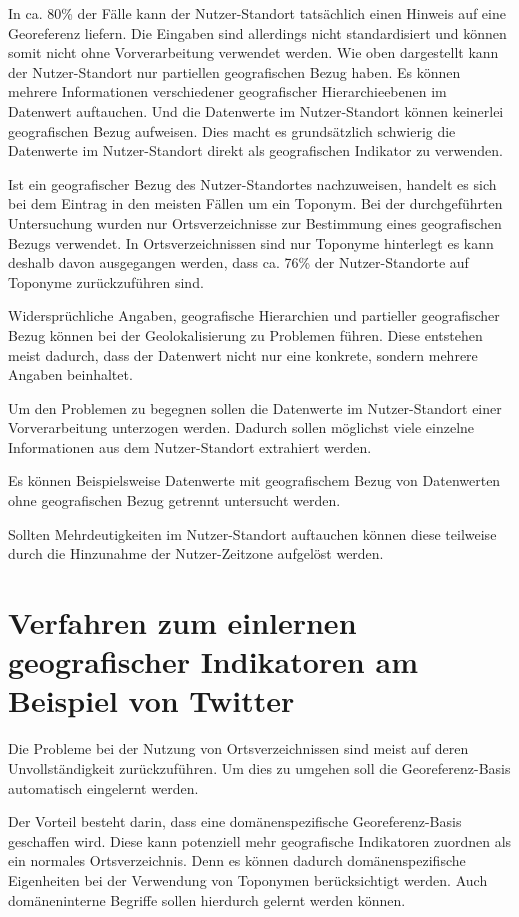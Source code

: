 			In ca. 80\% der Fälle kann der Nutzer-Standort tatsächlich einen Hinweis auf eine Georeferenz liefern.
			Die Eingaben sind allerdings nicht standardisiert und können somit nicht ohne Vorverarbeitung verwendet werden.
			Wie oben dargestellt kann der Nutzer-Standort nur partiellen geografischen Bezug haben.
			Es können mehrere Informationen verschiedener geografischer Hierarchieebenen im Datenwert auftauchen. 
			Und die Datenwerte im Nutzer-Standort können keinerlei geografischen Bezug aufweisen.
			Dies macht es grundsätzlich schwierig die Datenwerte im Nutzer-Standort direkt als geografischen Indikator zu verwenden.
			
			Ist ein geografischer Bezug des Nutzer-Standortes nachzuweisen, handelt es sich bei dem Eintrag in den meisten Fällen um ein Toponym.
			Bei der durchgeführten Untersuchung wurden nur Ortsverzeichnisse zur Bestimmung eines geografischen Bezugs verwendet.
			In Ortsverzeichnissen sind nur Toponyme hinterlegt es kann deshalb davon ausgegangen werden, dass ca. 76\% der Nutzer-Standorte auf Toponyme zurückzuführen sind.

			Widersprüchliche Angaben, geografische Hierarchien und partieller geografischer Bezug können bei der Geolokalisierung zu Problemen führen.
			Diese entstehen meist dadurch, dass der Datenwert nicht nur eine konkrete, sondern mehrere Angaben beinhaltet.
			
			Um den Problemen zu begegnen sollen die Datenwerte im Nutzer-Standort einer Vorverarbeitung unterzogen werden. 
			Dadurch sollen möglichst viele einzelne Informationen aus dem Nutzer-Standort extrahiert werden.

			Es können Beispielsweise Datenwerte mit geografischem Bezug von Datenwerten ohne geografischen Bezug getrennt untersucht werden.

			Sollten Mehrdeutigkeiten im Nutzer-Standort auftauchen können diese teilweise durch die Hinzunahme der Nutzer-Zeitzone aufgelöst werden.

	\section{Verfahren zum einlernen geografischer Indikatoren am Beispiel von Twitter} \label{sec:einlernen}  

		Die Probleme bei der Nutzung von Ortsverzeichnissen sind meist auf deren Unvollständigkeit zurückzuführen. 
		Um dies zu umgehen soll die Georeferenz-Basis automatisch eingelernt werden. 

		Der Vorteil besteht darin, dass eine domänenspezifische Georeferenz-Basis geschaffen wird.
		Diese kann potenziell mehr geografische Indikatoren zuordnen als ein normales Ortsverzeichnis.
		Denn es können dadurch domänenspezifische Eigenheiten bei der Verwendung von Toponymen berücksichtigt werden. 
		Auch domäneninterne Begriffe sollen hierdurch gelernt werden können.

